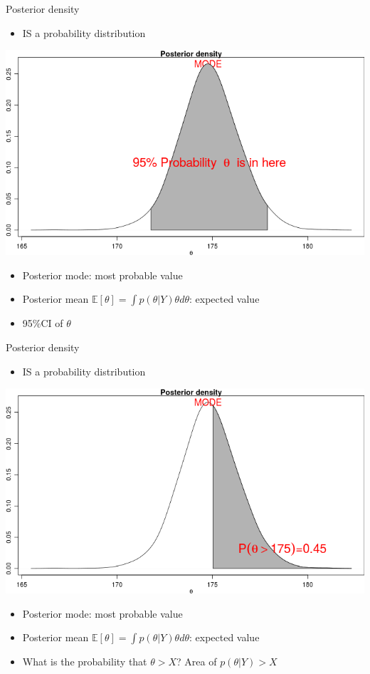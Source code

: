 \documentclass[presentation]{beamer}
\begin{document}
\begin{frame}[label=sec-13]{Posterior density}
\begin{itemize}
\item IS a probability distribution
\end{itemize}
\includegraphics[width=.9\linewidth]{posterior3.png}

\begin{itemize}
\item Posterior mode: most probable value
\item Posterior mean $\mathbb{E}[\theta]=\int p(\theta\vert Y)\theta d\theta$: expected value
\item 95\%CI of $\theta$
\end{itemize}
\end{frame}
\begin{frame}[label=sec-14]{Posterior density}
\begin{itemize}
\item IS a probability distribution
\end{itemize}
\includegraphics[width=.9\linewidth]{posterior4.png}

\begin{itemize}
\item Posterior mode: most probable value
\item Posterior mean $\mathbb{E}[\theta]=\int p(\theta\vert Y)\theta d\theta$: expected value
\item What is the probability that $\theta>X$? Area of $p(\theta\vert Y)>X$
\end{itemize}
\end{frame}
\end{document}

